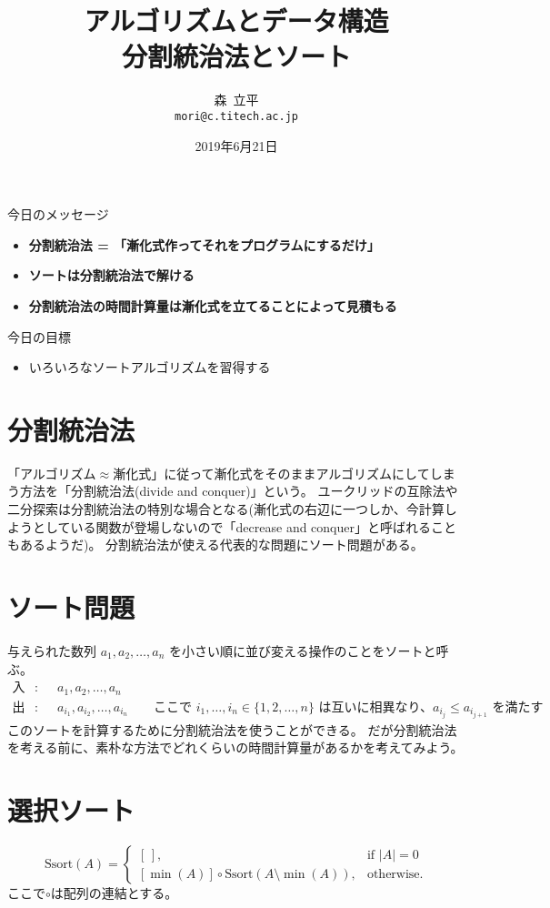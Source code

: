 \documentclass[a4paper,twoside,onecolumn,openany,article,10pt]{memoir}
\title{アルゴリズムとデータ構造\\\vspace{.5em} \Large 分割統治法とソート}
\date{2019年6月21日}
\author{森~立平\\ \texttt{mori@c.titech.ac.jp}}
\theoremstyle{remark}
\begin{document}
\maketitle


\noindent
今日のメッセージ
\begin{itemize}
\item \textbf{分割統治法 = 「漸化式作ってそれをプログラムにするだけ」}
\item \textbf{ソートは分割統治法で解ける}
\item \textbf{分割統治法の時間計算量は漸化式を立てることによって見積もる}
\end{itemize}

\noindent
今日の目標
\begin{itemize}
\item いろいろなソートアルゴリズムを習得する
\end{itemize}




\section{分割統治法}
「アルゴリズム$\approx$漸化式」に従って漸化式をそのままアルゴリズムにしてしまう方法を「分割統治法(divide and conquer)」という。
ユークリッドの互除法や二分探索は分割統治法の特別な場合となる(漸化式の右辺に一つしか、今計算しようとしている関数が登場しないので「decrease and conquer」と呼ばれることもあるようだ)。
分割統治法が使える代表的な問題にソート問題がある。
\section{ソート問題}
与えられた数列 $a_1, a_2,\dotsc, a_n$ を小さい順に並び変える操作のことをソートと呼ぶ。
\begin{align*}
\text{入力}:&\quad a_1, a_2,\dotsc, a_n\\
\text{出力}:&\quad a_{i_1}, a_{i_2}, \dotsc, a_{i_n} \qquad \text{ここで $i_1,\dotsc,i_n\in\{1,2,\dotsc,n\}$ は互いに相異なり、$a_{i_j}\le a_{i_{j+1}}$ を満たす}
\end{align*}
このソートを計算するために分割統治法を使うことができる。
だが分割統治法を考える前に、素朴な方法でどれくらいの時間計算量があるかを考えてみよう。

\section{選択ソート}
\begin{equation*}
\mathrm{Ssort}(A) =
\begin{cases}
[\,],&\text{if } |A| = 0\\
[\min(A)] \circ \mathrm{Ssort}(A\setminus \min(A)),& \text{otherwise.}
\end{cases}
\end{equation*}
ここで$\circ$は配列の連結とする。
\end{document}

